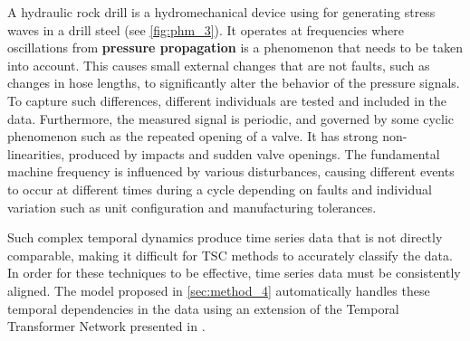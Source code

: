 A hydraulic rock drill is a hydromechanical device using for generating stress waves in a drill steel (see \cref{fig:phm_3}). It operates at frequencies where oscillations from \textbf{pressure propagation} is a phenomenon that needs to be taken into account. 
This causes small external changes that are not faults, such as changes in hose lengths, to significantly alter the behavior of the pressure signals. To capture such differences, different individuals are tested and included in the data. 
Furthermore, the measured signal is periodic, and governed by some cyclic phenomenon such as the repeated opening of a valve. It has strong non-linearities, produced by impacts and sudden valve openings. The fundamental machine frequency is influenced by various disturbances, causing different events to occur at different times during a cycle depending on faults and individual variation such as unit configuration and manufacturing tolerances.

Such complex temporal dynamics produce time series data that is not directly comparable, making it difficult for TSC methods to accurately classify the data. In order for these techniques to be effective, time series data must be consistently aligned. The model proposed in \cref{sec:method_4} automatically handles these temporal dependencies in the data using an extension of the Temporal Transformer Network presented in \cite{martinez2022closed}.





